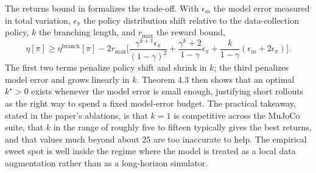 The returns bound in \citet[Theorem 4.2]{janner2019model} formalizes the trade-off. With $\epsilon_m$ the model error measured in total variation, $\epsilon_\pi$ the policy distribution shift relative to the data-collection policy, $k$ the branching length, and $r_{\max}$ the reward bound,
\[ \eta[\pi] \ge \eta^{\text{branch}}[\pi] - 2 r_{\max} \Big[ \frac{\gamma^{k+1} \epsilon_\pi}{(1 - \gamma)^2} + \frac{\gamma^k + 2}{1 - \gamma} \epsilon_\pi + \frac{k}{1 - \gamma}(\epsilon_m + 2 \epsilon_\pi) \Big]. \]
The first two terms penalize policy shift and shrink in $k$; the third penalizes model error and grows linearly in $k$. Theorem 4.3 then shows that an optimal $k^\star > 0$ exists whenever the model error is small enough, justifying short rollouts as the right way to spend a fixed model-error budget. The practical takeaway, stated in the paper's ablations, is that $k = 1$ is competitive across the MuJoCo suite, that $k$ in the range of roughly five to fifteen typically gives the best returns, and that values much beyond about $25$ are too inaccurate to help. The empirical sweet spot is well inside the regime where the model is treated as a local data augmentation rather than as a long-horizon simulator.

